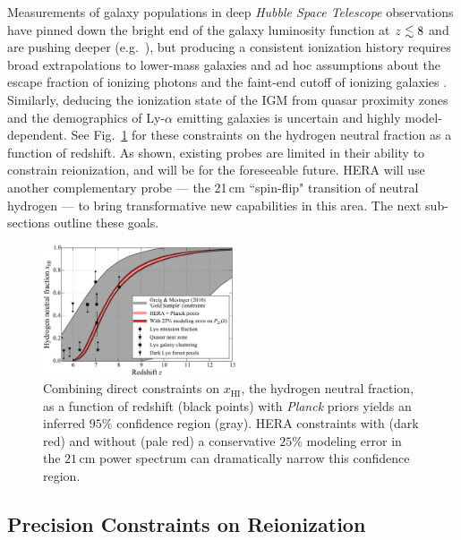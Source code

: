 \documentclass[preprint,11pt]{aastex}
\begin{document}
Measurements of galaxy populations in
deep {\it Hubble Space Telescope} observations 
have pinned down the bright end of the galaxy luminosity function at $z \lesssim 8$
\citep{schenker_et_al2013, bouwens_et_al2015} and are pushing deeper
(e.g.~\citealt{mcleod_et_al2015}), but producing a consistent ionization history
requires broad extrapolations to
lower-mass galaxies and ad hoc assumptions about the escape fraction of
ionizing photons and the faint-end cutoff of ionizing galaxies
\citep{robertson_et_al2015, bouwens_et_al2015_reion}. 
Similarly, deducing the ionization state of the IGM from quasar proximity zones
\citep{carilli_et_al2010, bolton_et_al2011, bosman_becker2015} and the
demographics of Ly-$\alpha$ emitting galaxies \citep{fontana_et_al2010,
schenker_et_al2012, treu_et_al2012, dijkstra_et_al2014} is uncertain and
highly model-dependent.  See Fig.~\ref{fig:IonHist} for these constraints on the hydrogen neutral fraction as a function of redshift.
As shown, existing probes are limited in
their ability to constrain reionization, and will be for the foreseeable future.
HERA will use
another complementary probe --- the 21\,cm ``spin-flip" transition of neutral hydrogen
--- to bring transformative new capabilities in this area.  The next sub-sections outline these goals.

\begin{figure}[h!]
\centering
    \includegraphics[width=0.51\textwidth,clip]{plots/ionHist.pdf}
  \caption{Combining direct constraints on $x_\text{HI}$, the hydrogen neutral fraction, as a function of redshift (black points) with \emph{Planck} priors yields
an inferred $95\%$ confidence region (gray).  HERA constraints with (dark red) and without (pale red) 
a conservative $25\%$ modeling error in the $21\,\textrm{cm}$ power spectrum can dramatically narrow this confidence region.}
	\label{fig:IonHist}
\end{figure} 


\subsection{Precision Constraints on Reionization}
\label{sec:EoRPowerSpectra}
\end{document}
